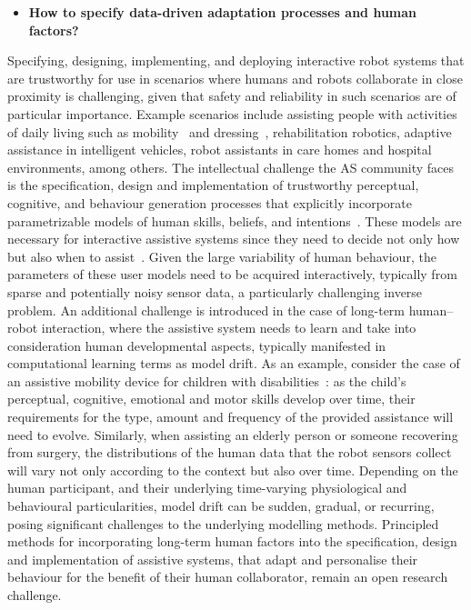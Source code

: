\documentclass[sigconf,nonacm]{acmart}%
\begin{document}
	\begin{itemize}[leftmargin=0.5cm]
		\item \textbf{How to specify data-driven adaptation processes and human factors?}
	\end{itemize}
	Specifying, designing, implementing, and deploying interactive robot systems that are trustworthy for use in scenarios where humans and robots collaborate in close proximity is challenging, given that safety and reliability in such scenarios are of particular importance. Example scenarios include assisting people with activities of daily living such as mobility~\cite{SohDemiris2015} and dressing~\cite{GaoEtAl2020}, rehabilitation robotics, adaptive assistance in intelligent vehicles, robot assistants in care homes and hospital environments, among others. The intellectual challenge the AS community faces is the specification, design and implementation of trustworthy perceptual, cognitive, and behaviour generation processes that explicitly incorporate parametrizable models of human skills, beliefs, and intentions~\cite{Demiris2007}. 
	These models are necessary for interactive assistive systems since they need to decide not only how but also when to assist~\cite{GeorgiouDemiris}. Given the large variability of human behaviour, the parameters of these user models need to be acquired interactively, typically from sparse and potentially noisy sensor data, a particularly challenging inverse problem. An additional challenge is introduced in the case of long-term human–robot interaction, where the assistive system needs to learn and take into consideration human developmental aspects, typically manifested in computational learning terms as model drift. 
	As an example, consider the case of an assistive mobility device for children with disabilities~\cite{SohDemiris2015}: as the child's perceptual, cognitive, emotional and motor skills develop over time, their requirements for the type, amount and frequency of the provided assistance will need to evolve. Similarly, when assisting an elderly person or someone recovering from surgery, the distributions of the human data that the robot sensors collect will vary not only according to the context but also over time. 
	Depending on the human participant, and their underlying time-varying physiological and behavioural particularities, model drift can be sudden, gradual, or recurring, posing significant challenges to the underlying modelling methods. Principled methods for incorporating long-term human factors into the specification, design and implementation of assistive systems, that adapt and personalise their behaviour for the benefit of their human collaborator, remain an open research challenge. 
	
\end{document}
